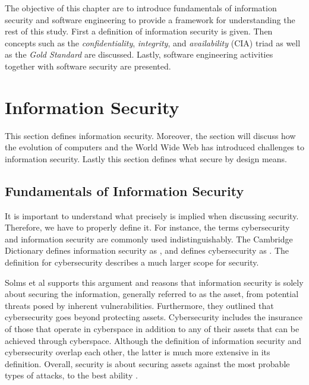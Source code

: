 The objective of this chapter are to introduce fundamentals of information security and software engineering to provide a framework for understanding the rest of this study. First a definition of information security is given. Then concepts such as the \emph{confidentiality}, \emph{integrity}, and \textit{availability} (CIA) triad as well as the \textit{Gold Standard} are discussed. Lastly,  software engineering activities together with software security are presented.

\section{Information Security}
This section defines information security. Moreover, the section will discuss how the evolution of computers and the World Wide Web has introduced challenges to information security. Lastly this section defines what secure by design means.

\subsection{Fundamentals of Information Security}
It is important to understand what precisely is implied when discussing security. Therefore, we have to properly define it. For instance, the terms cybersecurity and information security are commonly used indistinguishably. The Cambridge Dictionary defines information security as , and defines cybersecurity as . The definition for cybersecurity describes a much larger scope for security. 

Solms et al \cite{von_Solms_2013} supports this argument and reasons that information security is solely about securing the information, generally referred to as the asset, from potential threats posed by inherent vulnerabilities. Furthermore, they outlined that cybersecurity goes beyond protecting assets. Cybersecurity includes the insurance of those that operate in cyberspace in addition to any of their assets that can be achieved through cyberspace. Although the definition of information security and cybersecurity overlap each other, the latter is much more extensive in its definition. Overall, security is about securing assets against the most probable types of attacks, to the best ability \cite{andress2014the}.

